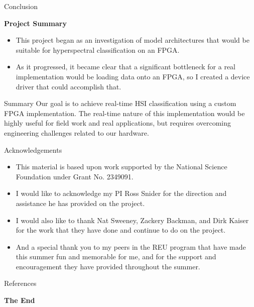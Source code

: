 \documentclass[aspectratio=169,xcolor=dvipsnames]{beamer}
\newcommand\myheading[1]{%
  \par\bigskip
  {\Large\bfseries#1}\par\smallskip}
\begin{document}
\begin{frame}{Conclusion}
    \myheading{Project Summary}
    \begin{itemize}
        \item This project began as an investigation of model architectures that would be suitable for hyperspectral classification on an FPGA.
        \item As it progressed, it became clear that a significant bottleneck for a real implementation would be loading data onto an FPGA, so I created a device driver that could accomplish that.
    \end{itemize}


    \begin{block}{Summary}
        Our goal is to achieve real-time HSI classification using a custom FPGA implementation. The real-time nature of this implementation would be highly useful for field work and real applications, but requires overcoming engineering challenges related to our hardware.
    \end{block}
\end{frame}


\begin{frame}{Acknowledgements}
    \begin{itemize}
        \item This material is based upon work supported by the National Science Foundation under Grant No. 2349091.
        \item I would like to acknowledge my PI Ross Snider for the direction and assistance he has provided on the project.
        \item I would also like to thank Nat Sweeney, Zackery Backman, and Dirk Kaiser for the work that they have done and continue to do on the project.
        \item And a special thank you to my peers in the REU program that have made this summer fun and memorable for me, and for the support and encouragement they have provided throughout the summer.
    \end{itemize}
\end{frame}


\begin{frame}[allowframebreaks]{References}
    \begingroup
    \tiny
    \setlength{\itemsep}{0pt}
    \setlength{\parsep}{0pt}
    \setlength{\parskip}{0pt}
    \nocite{*}
    
    
    \endgroup
\end{frame}

\begin{frame}
    \Huge{\centerline{\textbf{The End}}}
\end{frame}
\end{document}
